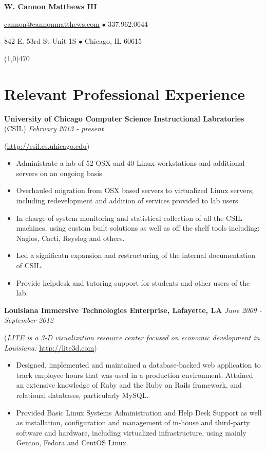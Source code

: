 \documentclass[10pt,letterpaper]{article} %
\begin{document}
 
    \centerline{\LARGE \bf W. Cannon Matthews III} 
    \centerline{ \href{mailto:cannon@cannonmatthews.com}{cannon@cannonmatthews.com} $\bullet$ 337.962.0644 } 
    \centerline{842 E. 53rd St Unit 1S $\bullet$ Chicago, IL 60615 }
    \line(1,0){470} 
%
    \section*{Relevant Professional Experience} 
        \textbf{University of Chicago Computer Science Instructional Labratories} (CSIL) \hfill \textit{February 2013 - present }
            \begin{footnotesize}
                (\url{http://csil.cs.uhicago.edu})
            \end{footnotesize}
            \begin{itemize}
            \item Administrate a lab of 52 OSX and 40 Linux workstations and additional servers on an ongoing basis
            \item Overhauled migration from OSX based servers to virtualized Linux servers, including redevelopment and addition of services provided to lab users.
            \item In charge of system monitoring and statistical collection of all the CSIL machines, using custom built solutions as well as off the shelf tools including: Nagios, Cacti, Rsyslog and others. 
	    \item Led a significatn expansion and restructuring of the internal documentation of CSIL. 
            \item Provide helpdesk and tutoring support for students and other users of the lab. 
            \end{itemize}
        \textbf{Louisiana Immersive Technologies Enterprise, Lafayette, LA} \hfill \textit{June 2009 - September 2012} 

            \begin{footnotesize}
                (\textit{LITE is a 3-D visualization resource center focused on economic development in Louisiana: }\url{http://lite3d.com})
            \end{footnotesize}
            \begin{itemize} 
            \item  Designed, implemented and maintained a database-backed web application to track 
                   employee hours that was used in a production environment. Attained an extensive knowledge of Ruby and the 
                   Ruby on Rails framework, and relational databases, particularly MySQL.
            \item  Provided Basic Linux Systems Administration and Help Desk Support as well as installation, configuration and 
                   management of in-house and third-party software and hardware, including virtualized infrastructure, using mainly Gentoo, Fedora and CentOS Linux.
            \end{itemize} 
\end{document}
